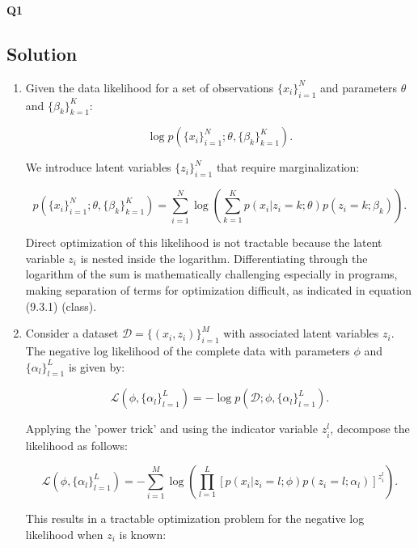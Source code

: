 \documentclass[submit]{harvardml}
\begin{document}
\newpage 
\textbf{Q1}
\subsection*{Solution}

\begin{enumerate}
  \item Given the data likelihood for a set of observations $\{x_i\}_{i=1}^N$ and parameters $\theta$ and $\{\beta_k\}_{k=1}^K$:

\begin{equation}
    \log p(\{x_i\}_{i=1}^N; \theta, \{\beta_k\}_{k=1}^K).
\end{equation}

We introduce latent variables $\{z_i\}_{i=1}^N$ that require marginalization:

\begin{equation}
    p(\{x_i\}_{i=1}^N; \theta, \{\beta_k\}_{k=1}^K) = \sum_{i=1}^N \log \left( \sum_{k=1}^K p(x_i | z_i=k; \theta) p(z_i=k; \beta_k) \right).
\end{equation}

Direct optimization of this likelihood is not tractable because the latent variable $z_i$ is nested inside the logarithm. Differentiating through the logarithm of the sum is mathematically challenging especially in programs, making separation of terms for optimization difficult, as indicated in equation (9.3.1) (class). 
  \item Consider a dataset \( \mathcal{D} = \{(x_i, z_i)\}_{i=1}^M \) with associated latent variables \( z_i \). The negative log likelihood of the complete data with parameters \( \phi \) and \( \{\alpha_l\}_{l=1}^L \) is given by:

\begin{equation}
    \mathcal{L}(\phi, \{\alpha_l\}_{l=1}^L) = -\log p(\mathcal{D}; \phi, \{\alpha_l\}_{l=1}^L).
\end{equation}

Applying the 'power trick' and using the indicator variable \( z_i^l \), decompose the likelihood as follows:

\begin{equation}
    \mathcal{L}(\phi, \{\alpha_l\}_{l=1}^L) = -\sum_{i=1}^M \log \left( \prod_{l=1}^L [p(x_i | z_i=l; \phi) p(z_i=l; \alpha_l)]^{z_i^l} \right).
\end{equation}

This results in a tractable optimization problem for the negative log likelihood when \( z_i \) is known:


\end{enumerate}
\end{document}
